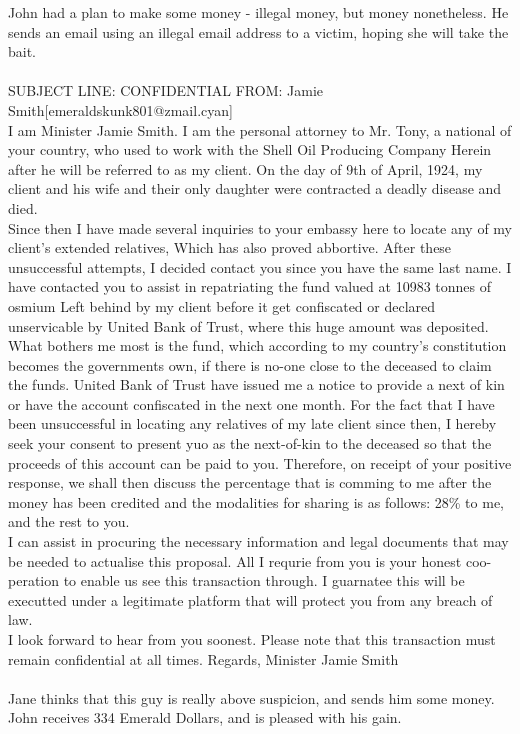 \documentclass{article}
\begin{document}
John had a plan to make some money {-} illegal money, but money nonetheless.
He sends an email using an illegal email address to a victim, hoping she will take the bait.
\\\\
SUBJECT LINE: CONFIDENTIAL
FROM: Jamie Smith[emeraldskunk801@zmail.cyan]
\\
I am Minister Jamie Smith.
I am the personal attorney to Mr. Tony, a national of your country, who used to work with the Shell Oil Producing Company
Herein after he will be referred to as my client.
On the day of 9th of April, 1924, my client and his wife and their only daughter were contracted a deadly disease and died.
\\
Since then I have made several inquiries to your embassy here to locate any of my client's extended relatives, Which has also proved abbortive.
After these unsuccessful attempts, I decided contact you since you have the same last name.
I have contacted you to assist in repatriating the fund valued at 10983 tonnes of osmium Left behind by my client before it get confiscated or declared unservicable by United Bank of Trust, where this huge amount was deposited.
\\
What bothers me most is the fund, which according to my country's constitution becomes the governments own, if there is no{-}one close to the deceased to claim the funds.
United Bank of Trust have issued me a notice to provide a next of kin or have the account confiscated in the next one month.
For the fact that I have been unsuccessful in locating any relatives of my late client since then, I hereby seek your consent to present yuo as the next{-}of{-}kin to the deceased so that the proceeds of this account can be paid to you.
Therefore, on receipt of your positive response, we shall then discuss the percentage that is comming to me after the money has been credited and the modalities for sharing is as follows: 28\% to me, and the rest to you.
\\
I can assist in procuring the necessary information and legal documents that may be needed to actualise this proposal.
All I requrie from you is your honest coo{-}peration to enable us see this transaction through.
I guarnatee this will be executted under a legitimate platform that will protect you from any breach of law.
\\
I look forward to hear from you soonest.
Please note that this transaction must remain confidential at all times.
Regards, Minister Jamie Smith
\\\\
Jane thinks that this guy is really above suspicion, and sends him some money.
John receives 334 Emerald Dollars, and is pleased with his gain.
\end{document}
